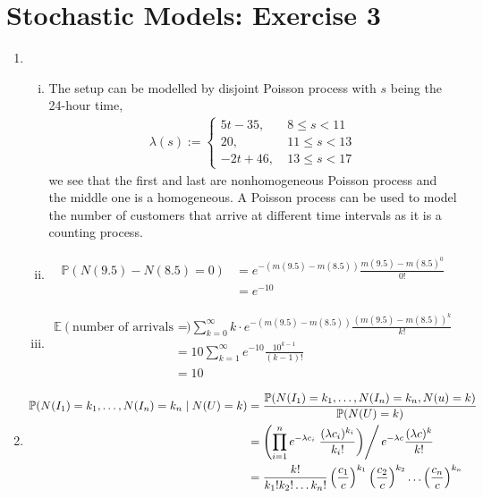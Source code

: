 \documentclass[a4paper,10pt]{article}
\theoremstyle{definition}
\begin{document}
\section*{Stochastic Models: Exercise 3}

\begin{enumerate}
\item
\begin{enumerate}[(i)]
\item 
The setup can be modelled by disjoint Poisson process with $s$ being the 24-hour time,
\begin{align*}
\lambda(s):=\begin{cases}
5t-35, &~8\leq s < 11\\
20, &~11\leq s < 13\\
-2t+46, &~13\leq s < 17
\end{cases}
\end{align*}
we see that the first and last are nonhomogeneous Poisson process and the middle one is a homogeneous. A Poisson process can be used to model the number of customers that arrive at different time intervals as it is a counting process.

\item 
\begin{align*}
\mathbb{P}(N(9.5)-N(8.5)=0)&=e^{-(m(9.5)-m(8.5))}\frac{m(9.5)-m(8.5)^0}{0!}\\
&=e^{-10}
\end{align*}
\item 
\begin{align*}
\mathbb{E}(\text{number of arrivals from 8:30AM-9:30AM})&=\sum_{k=0}^{\infty}k\cdot e^{-(m(9.5)-m(8.5))}\frac{(m(9.5)-m(8.5))^k}{k!}\\
&=10\sum_{k=1}^{\infty} e^{-10}\frac{10^{k-1}}{(k-1)!}\\
&=10
\end{align*}
\end{enumerate}
\item 
\begin{align*}
\mathbb{P}(N(I_1)=k_1,\ldots,N(I_n)=k_n\mid N(U)=k)&=\frac{\mathbb{P}(N(I_1)=k_1,\ldots,N(I_n)=k_n,N(u)=k)}{\mathbb{P}(N(U)=k)}\\
&=\left(\prod_{i=1}^{n}e^{-\lambda c_i}\left.\frac{(\lambda c_i)^{k_i}}{k_i!}\right)\right/ e^{-\lambda c}\frac{(\lambda c)^k}{k!}\\
&=\frac{k!}{k_1!k_2!\ldots k_n!}\left(\frac{c_1}{c}\right)^{k_1}\left(\frac{c_2}{c}\right)^{k_2}\ldots\left(\frac{c_n}{c}\right)^{k_n}
\end{align*}


\end{enumerate}
\end{document}
